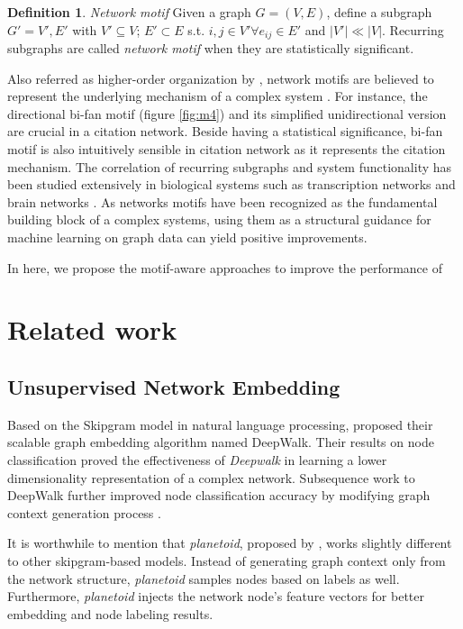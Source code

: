 \documentclass{article}
\theoremstyle{definition}
\newtheorem{definition}{Definition}[section]
\begin{document}
\begin{definition}{\emph{Network motif}}
Given a graph $G = (V,E)$, define a subgraph $G' = {V', E'}$ with $V' \subseteq V$;
$E' \subset E$ s.t. $i,j \in V' \forall e_{ij} \in E'$ and $|V'| \ll |V|$. Recurring subgraphs
are called \emph{network motif} when they are statistically significant.
\end{definition}

Also referred as higher-order organization by \citeauthor{juremotif}, 
network motifs are believed to represent the underlying mechanism of a 
complex system 
\cite{netmotif,alon2006introduction,mangan2003structure}. 
For instance, the directional bi-fan motif (figure \ref{fig:m4})
and its simplified unidirectional version are crucial in a citation 
network. Beside having a statistical significance, bi-fan motif is also 
intuitively sensible in citation network as it represents the citation 
mechanism. The correlation of recurring subgraphs and system 
functionality has been studied extensively in biological systems such as 
transcription networks \cite{mangan2003structure} and brain 
networks \cite{brainnetheuvel,honey2007network}. As networks motifs
have been recognized as the fundamental building block of a complex
systems, using them as a structural guidance for machine learning
on graph data can yield positive improvements.

In here, we propose the motif-aware approaches to improve the 
performance of  

\section{Related work}

\subsection{Unsupervised Network Embedding}

Based on the Skipgram model \cite{skipgram} in natural language 
processing, \citeauthor{Deepwalk} proposed their
scalable graph embedding algorithm named DeepWalk. Their results on node 
classification proved the effectiveness of \emph{Deepwalk} in learning a 
lower dimensionality representation of a complex network. Subsequence 
work to DeepWalk further improved node classification accuracy by 
modifying graph context generation process
\cite{line,grarep,planetoid,node2vec}. 

It is worthwhile to mention that \emph{planetoid}, proposed by 
\citeauthor{planetoid}, works slightly different to other skipgram-based 
models. Instead of generating graph context only from the network 
structure, \emph{planetoid} samples nodes based on labels as well. 
Furthermore, \emph{planetoid} injects the network
node's feature vectors for better embedding and node labeling results.
\end{document}
